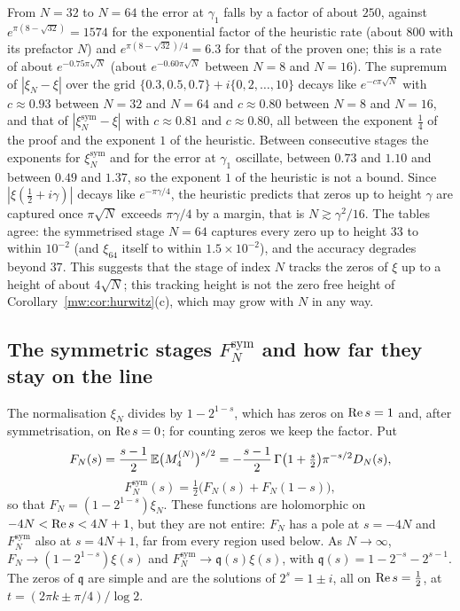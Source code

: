 From $N=32$ to $N=64$ the error at $\gamma_1$ falls by a factor of about $250$, against $e^{\pi(8-\sqrt{32})}=1574$ for the exponential factor of the heuristic rate (about $800$ with its prefactor $N$) and $e^{\pi(8-\sqrt{32})/4}=6.3$ for that of the proven one; this is a rate of about $e^{-0.75\pi\sqrt N}$ (about $e^{-0.60\pi\sqrt N}$ between $N=8$ and $N=16$). The supremum of $|\xi_N-\xi|$ over the grid $\{0.3,0.5,0.7\}+i\{0,2,\dots,10\}$ decays like $e^{-c\pi\sqrt N}$ with $c\approx0.93$ between $N=32$ and $N=64$ and $c\approx0.80$ between $N=8$ and $N=16$, and that of $|\xi_N^{\mathrm{sym}}-\xi|$ with $c\approx0.81$ and $c\approx0.80$, all between the exponent $\frac14$ of the proof and the exponent $1$ of the heuristic. Between consecutive stages the exponents for $\xi_N^{\mathrm{sym}}$ and for the error at $\gamma_1$ oscillate, between $0.73$ and $1.10$ and between $0.49$ and $1.37$, so the exponent $1$ of the heuristic is not a bound. Since $|\xi(\tfrac12+i\gamma)|$ decays like $e^{-\pi\gamma/4}$, the heuristic predicts that zeros up to height $\gamma$ are captured once $\pi\sqrt N$ exceeds $\pi\gamma/4$ by a margin, that is $N\gtrsim\gamma^2/16$. The tables agree: the symmetrised stage $N=64$ captures every zero up to height $33$ to within $10^{-2}$ (and $\xi_{64}$ itself to within $1.5\times10^{-2}$), and the accuracy degrades beyond $37$. This suggests that the stage of index $N$ tracks the zeros of $\xi$ up to a height of about $4\sqrt N$; this tracking height is not the zero free height of Corollary~\ref{mw:cor:hurwitz}(c), which may grow with $N$ in any way.

\subsection{The symmetric stages $F_N^{\mathrm{sym}}$ and how far they stay on the line}\label{mw:sec:finiteN}

The normalisation $\xi_N$ divides by $1-2^{1-s}$, which has zeros on $\operatorname{Re} s=1$ and, after symmetrisation, on $\operatorname{Re} s=0$; for counting zeros we keep the factor. Put
\[
F_N(s)=\frac{s-1}2\,\mathbb{E}\bigl(M_4^{(N)}\bigr)^{s/2}=-\frac{s-1}2\,\Gamma\bigl(1+\tfrac s2\bigr)\pi^{-s/2}D_N(s),
\]
\[
F_N^{\mathrm{sym}}(s)=\tfrac12\bigl(F_N(s)+F_N(1-s)\bigr),
\]
so that $F_N=(1-2^{1-s})\xi_N$. These functions are holomorphic on $-4N<\operatorname{Re} s<4N+1$, but they are not entire: $F_N$ has a pole at $s=-4N$ and $F_N^{\mathrm{sym}}$ also at $s=4N+1$, far from every region used below. As $N\to\infty$, $F_N\to(1-2^{1-s})\xi(s)$ and $F_N^{\mathrm{sym}}\to\mathfrak q(s)\xi(s)$, with $\mathfrak q(s)=1-2^{-s}-2^{s-1}$. The zeros of $\mathfrak q$ are simple and are the solutions of $2^s=1\pm i$, all on $\operatorname{Re} s=\tfrac12$, at $t=(2\pi k\pm\pi/4)/\log2$.

